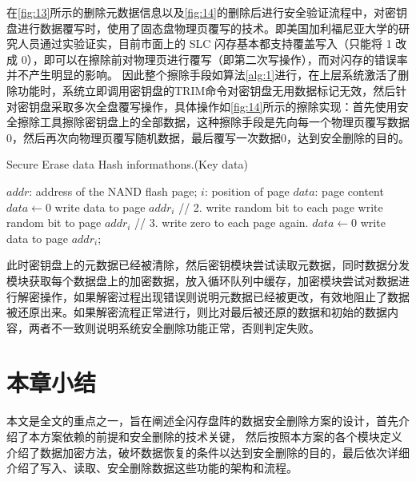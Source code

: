 在\autoref{fig:13}所示的删除元数据信息以及\autoref{fig:14}的删除后进行安全验证流程中，对密钥盘进行数据覆写时，使用了固态盘物理页覆写的技术。即美国加利福尼亚大学的研究人员通过实验证实\cite{Wei2011Reliably}，目前市面上的 SLC 闪存基本都支持覆盖写入（只能将 1 改成 0），即可以在擦除前对物理页进行覆写（即第二次写操作），而对闪存的错误率并不产生明显的影响。
因此整个擦除手段如算法\autoref{alg:1}进行，在上层系统激活了删除功能时，系统立即调用密钥盘的TRIM命令对密钥盘无用数据标记无效，然后针对密钥盘采取多次全盘覆写操作，具体操作如\autoref{fig:14}所示的擦除实现：首先使用安全擦除工具擦除密钥盘上的全部数据，这种擦除手段是先向每一个物理页覆写数据0，然后再次向物理页覆写随机数据，最后覆写一次数据0，达到安全删除的目的。
\begin{algorithm}[H]
\caption{Secure Erase data Hash informathons.(Key data)}
\label{alg:1}
\begin{algorithmic}
	\REQUIRE
	$addr$: address of the NAND flash page;
	$i$: position of page
	$data$: page content
	\STATE $data \gets 0$
	\STATE write data to page $addr_i$
	\ENDFOR
	\STATE // 2. write random bit to each page
	\STATE write random bit to page $addr_i$
	\ENDFOR
	\STATE // 3. write zero to each page again.
	\STATE $data \gets 0$
	\STATE write data to page $addr_i$;
	\ENDFOR
\end{algorithmic}
\end{algorithm}


此时密钥盘上的元数据已经被清除，然后密钥模块尝试读取元数据，同时数据分发模块获取每个数据盘上的加密数据，放入循环队列中缓存，加密模块尝试对数据进行解密操作，如果解密过程出现错误则说明元数据已经被更改，有效地阻止了数据被还原出来。如果解密流程正常进行，则比对最后被还原的数据和初始的数据内容，两者不一致则说明系统安全删除功能正常，否则判定失败。

\section{本章小结}
本文是全文的重点之一，旨在阐述全闪存盘阵的数据安全删除方案的设计，首先介绍了本方案依赖的前提和安全删除的技术关键，
然后按照本方案的各个模块定义介绍了数据加密方法，破坏数据恢复的条件以达到安全删除的目的，最后依次详细介绍了写入、读取、安全删除数据这些功能的架构和流程。
